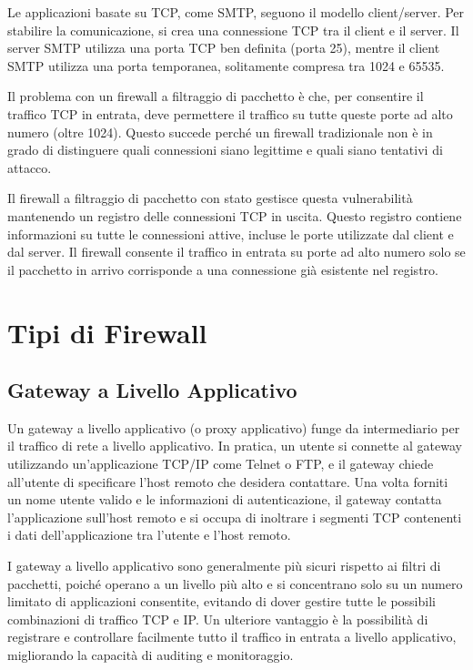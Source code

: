 Le applicazioni basate su TCP, come SMTP, seguono il modello client/server. Per stabilire la comunicazione, si crea una connessione TCP tra il client e il server. Il server SMTP utilizza una porta TCP ben definita (porta 25), mentre il client SMTP utilizza una porta temporanea, solitamente compresa tra 1024 e 65535.

Il problema con un firewall a filtraggio di pacchetto è che, per consentire il traffico TCP in entrata, deve permettere il traffico su tutte queste porte ad alto numero (oltre 1024). Questo succede perché un firewall tradizionale non è in grado di distinguere quali connessioni siano legittime e quali siano tentativi di attacco.

Il firewall a filtraggio di pacchetto con stato gestisce questa vulnerabilità mantenendo un registro delle connessioni TCP in uscita. Questo registro contiene informazioni su tutte le connessioni attive, incluse le porte utilizzate dal client e dal server. Il firewall consente il traffico in entrata su porte ad alto numero solo se il pacchetto in arrivo corrisponde a una connessione già esistente nel registro.

\section{Tipi di Firewall}

\subsection{Gateway a Livello Applicativo}

Un gateway a livello applicativo (o proxy applicativo) funge da intermediario per il traffico di rete a livello applicativo. In pratica, un utente si connette al gateway utilizzando un'applicazione TCP/IP come Telnet o FTP, e il gateway chiede all'utente di specificare l'host remoto che desidera contattare. Una volta forniti un nome utente valido e le informazioni di autenticazione, il gateway contatta l'applicazione sull'host remoto e si occupa di inoltrare i segmenti TCP contenenti i dati dell'applicazione tra l'utente e l'host remoto.

I gateway a livello applicativo sono generalmente più sicuri rispetto ai filtri di pacchetti, poiché operano a un livello più alto e si concentrano solo su un numero limitato di applicazioni consentite, evitando di dover gestire tutte le possibili combinazioni di traffico TCP e IP. Un ulteriore vantaggio è la possibilità di registrare e controllare facilmente tutto il traffico in entrata a livello applicativo, migliorando la capacità di auditing e monitoraggio.

